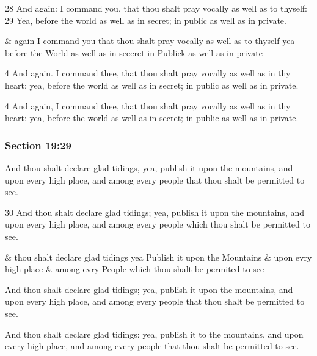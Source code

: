 		\begin{framed}
		\scriptsize
			\begin{compactdesc}
				\item[JSP] 28 And again: I command you, that thou shalt pray vocally as well as to thyself: 29 Yea, before the world as well as in secret; in public as well as in private.
				\item[RB1] \& again I command you that thou shalt pray vocally as well as to thyself yea before the World as well as in seecret in Publick as well as in private
				\item[DC 1835] 4 And again. I command thee, that thou shalt pray vocally as well as in thy heart: yea, before the world as well as in secret; in public as well as in private. 
				\item[DC 1844] 4 And again, I command thee, that thou shalt pray vocally as well as in thy heart: yea, before the world as well as in secret; in public as well as in private. 
			\end{compactdesc}
		\end{framed}

	\subsubsection{Section 19:29} %
		\label{DC19-29}

		And thou shalt declare glad tidings, yea, publish it upon the mountains, and upon every high place, and among every people that thou shalt be permitted to see.

		\begin{framed}
		\scriptsize
			\begin{compactdesc}
				\item[JSP] 30 And thou shalt declare glad tidings; yea, publish it upon the mountains, and upon every high place, and among every people which thou shalt be permitted to see.
				\item[RB1] \& thou shalt declare glad tidings yea Publish it upon the Mountains \& upon evry high place \& among evry People which thou shalt be permited to see
				\item[DC 1835] And thou shalt declare glad tidings; yea, publish it upon the mountains, and upon every high place, and among every people that thou shalt be permitted to see. 
				\item[DC 1844] And thou shalt declare glad tidings: yea, publish it to the mountains, and upon every high place, and among every people that thou shalt be permitted to see. 
			\end{compactdesc}
		\end{framed}

